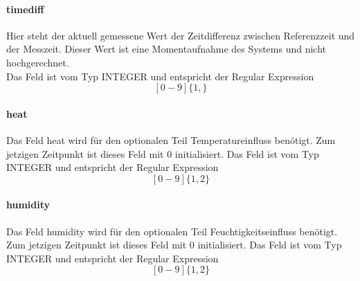     \paragraph{timediff}
    Hier steht der aktuell gemessene Wert der Zeitdifferenz zwischen Referenzzeit und der Messzeit. Dieser Wert ist eine Momentaufnahme des Systems und nicht hochgerechnet.\\
    Das Feld ist vom Typ INTEGER und entspricht der Regular Expression
    $$[0-9]\{1,\}$$
    \paragraph{heat}
    Das Feld heat wird für den optionalen Teil Temperatureinfluss benötigt. Zum jetzigen Zeitpunkt ist dieses Feld mit 0 initialisiert.
    Das Feld ist vom Typ INTEGER und entspricht der Regular Expression
    $$[0-9]\{1,2\}$$
    \paragraph{humidity}
    Das Feld humidity wird für den optionalen Teil Feuchtigkeitseinfluss benötigt. Zum jetzigen Zeitpunkt ist dieses Feld mit 0 initialisiert.
    Das Feld ist vom Typ INTEGER und entspricht der Regular Expression
    $$[0-9]\{1,2\}$$
